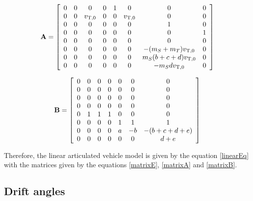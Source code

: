 \documentclass[sublist,a4paper,twoside,11pt]{article}
\begin{document}
\begin{equation} \label{matrixA}
{\bf A} = \left[ \begin{array}{cccccccc} 0 & 0 &  0 & 0 & 1 &  0 &                 0 & 0 \\
                                0 & 0 & v_{{\rm T},0} & 0 & 0 & v_{{\rm T},0} &                 0 & 0 \\
                                0 & 0 &  0 & 0 & 0 &  0 &                 1 & 0 \\
                                0 & 0 &  0 & 0 & 0 &  0 &                 0 & 1 \\
                                0 & 0 &  0 & 0 & 0 &  0 &                 0 & 0 \\
                                0 & 0 &  0 & 0 & 0 &  0 &     -(m_S + m_T) v_{{\rm T},0} & 0 \\
                                0 & 0 &  0 & 0 & 0 &  0 & m_S (b + c + d) v_{{\rm T},0} & 0 \\
                                0 & 0 &  0 & 0 & 0 &  0 &          - m_S d v_{{\rm T},0} & 0 \end{array} \right]
\end{equation}

\begin{equation} \label{matrixB}
    {\bf B} = \left[ \begin{array}{cccccccc}
0 & 0 & 0 & 0 & 0 &  0 &               0 \\
0 & 0 & 0 & 0 & 0 &  0 &               0 \\
0 & 0 & 0 & 0 & 0 &  0 &               0 \\
0 & 0 & 0 & 0 & 0 &  0 &               0 \\
0 & 1 & 1 & 1 & 0 &  0 &               0 \\
0 & 0 & 0 & 0 & 1 &  1 &               1 \\
0 & 0 & 0 & 0 & a & - b & - (b + c + d + e) \\
0 & 0 & 0 & 0 & 0 &  0 &           d + e \end{array} \right]
\end{equation}

Therefore, the linear articulated vehicle model is given by the equation \eqref{linearEq} with the matrices given by the equations \eqref{matrixE}, \eqref{matrixA} and \eqref{matrixB}.

\subsection{Drift angles}
\end{document}
